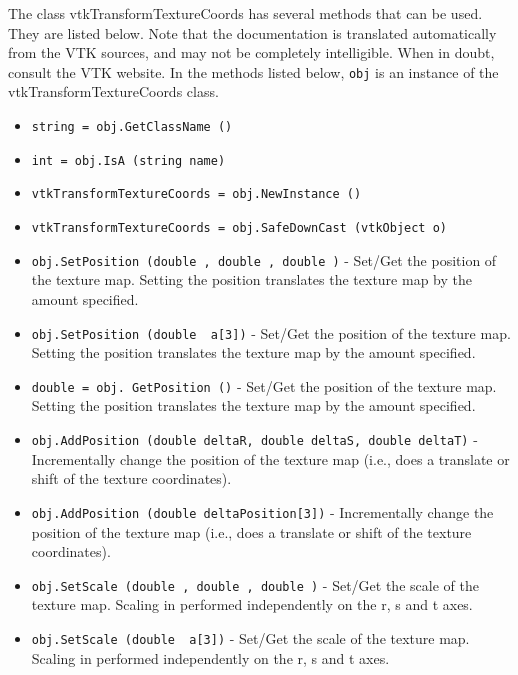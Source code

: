 The class vtkTransformTextureCoords has several methods that can be used.
  They are listed below.
Note that the documentation is translated automatically from the VTK sources,
and may not be completely intelligible.  When in doubt, consult the VTK website.
In the methods listed below, \verb|obj| is an instance of the vtkTransformTextureCoords class.
\begin{itemize}
\item  \verb|string = obj.GetClassName ()|

\item  \verb|int = obj.IsA (string name)|

\item  \verb|vtkTransformTextureCoords = obj.NewInstance ()|

\item  \verb|vtkTransformTextureCoords = obj.SafeDownCast (vtkObject o)|

\item  \verb|obj.SetPosition (double , double , double )| -  Set/Get the position of the texture map. Setting the position translates
 the texture map by the amount specified. 

\item  \verb|obj.SetPosition (double  a[3])| -  Set/Get the position of the texture map. Setting the position translates
 the texture map by the amount specified. 

\item  \verb|double = obj. GetPosition ()| -  Set/Get the position of the texture map. Setting the position translates
 the texture map by the amount specified. 

\item  \verb|obj.AddPosition (double deltaR, double deltaS, double deltaT)| -  Incrementally change the position of the texture map (i.e., does a
 translate or shift of the texture coordinates).

\item  \verb|obj.AddPosition (double deltaPosition[3])| -  Incrementally change the position of the texture map (i.e., does a
 translate or shift of the texture coordinates).

\item  \verb|obj.SetScale (double , double , double )| -  Set/Get the scale of the texture map. Scaling in performed independently 
 on the r, s and t axes.

\item  \verb|obj.SetScale (double  a[3])| -  Set/Get the scale of the texture map. Scaling in performed independently 
 on the r, s and t axes.


\end{itemize}
